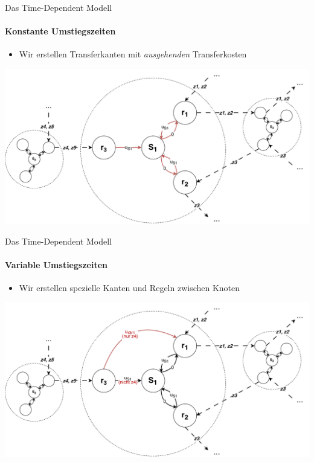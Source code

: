 \begin{frame}{Das Time-Dependent Modell}
	\framesubtitle{Konstante Umstiegszeiten}
	\begin{itemize}
		\item Wir erstellen Transferkanten mit \textit{ausgehenden} Transferkosten
	\end{itemize}

	\begin{center}
		\includegraphics[width=.90\linewidth]{images/time-dependent/model_1.pdf}
	\end{center}
\end{frame}


\begin{frame}{Das Time-Dependent Modell}
	\framesubtitle{Variable Umstiegszeiten}
	\begin{itemize}
		\item Wir erstellen spezielle Kanten und Regeln zwischen Knoten
	\end{itemize}

	\begin{center}
		\includegraphics[width=.90\linewidth]{images/time-dependent/model_2.pdf}
	\end{center}
\end{frame}



